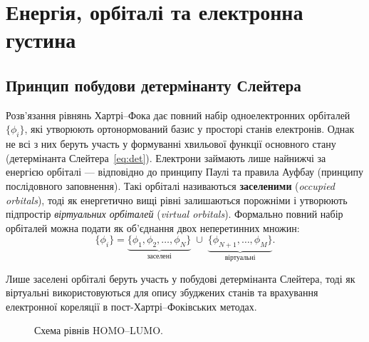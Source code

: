 
\section{Енергія, орбіталі та електронна густина}


\subsection{Принцип побудови детермінанту Слейтера}

Розв’язання рівнянь Хартрі–Фока дає повний набір одноелектронних орбіталей
$\{\phi_i\}$, які утворюють ортонормований базис у просторі станів електронів.
Однак не всі з них беруть участь у формуванні хвильової функції основного стану
(детермінанта Слейтера~\eqref{eq:det}).
Електрони займають лише найнижчі за енергією орбіталі --- відповідно до принципу
Паулі та правила Ауфбау (принципу послідовного заповнення).
Такі орбіталі називаються \textbf{заселеними} (\emph{occupied orbitals}),
тоді як енергетично вищі рівні залишаються порожніми
і утворюють підпростір \emph{віртуальних орбіталей} (\textit{virtual orbitals}).
Формально повний набір орбіталей можна подати як об’єднання двох неперетинних множин:
\begin{equation*}
\{\phi_i\} =
\underbrace{\{\phi_1, \phi_2, \ldots, \phi_N\}}_{\text{заселені}}
\;\cup\;
\underbrace{\{\phi_{N+1}, \ldots, \phi_M\}}_{\text{віртуальні}}.
\end{equation*}

Лише заселені орбіталі беруть участь у побудові детермінанта Слейтера,
тоді як віртуальні використовуються для опису збуджених станів
та врахування електронної кореляції в пост-Хартрі–Фоківських методах.

\begin{figure}
\centering
{}
\caption{Схема рівнів HOMO–LUMO.}
\label{tikz:HOMO-LUMO}
\end{figure}

